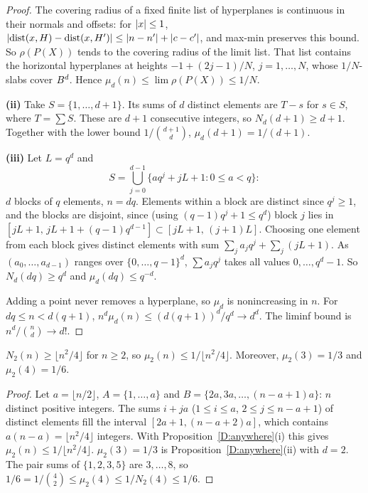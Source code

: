 \documentclass[11pt]{article}
\begin{document}
\begin{proof}
The covering radius of a fixed finite list of hyperplanes is continuous in their normals and
offsets: for $\left|x\right|\le1$, $\left|\operatorname{dist}(x,H)-\operatorname{dist}(x,H')\right|\le\left|n-n'\right|+\left|c-c'\right|$, and max-min
preserves this bound. So $\rho(P(X))$ tends to the covering radius of the limit list. That list
contains the horizontal hyperplanes at heights $-1+(2j-1)/N$, $j=1,\dots,N$, whose $1/N$-slabs cover
$B^d$. Hence $\mu_d(n)\le\lim\rho(P(X))\le1/N$.

\textbf{(ii)} Take $S=\{1,\dots,d+1\}$. Its sums of $d$ distinct elements are $T-s$ for $s\in S$, where
$T=\sum S$. These are $d+1$ consecutive integers, so $N_d(d+1)\ge d+1$. Together with the lower
bound $1/\binom{d+1}{d}$, $\mu_d(d+1)=1/(d+1)$.

\textbf{(iii)} Let $L=q^d$ and
\[
  S=\bigcup_{j=0}^{d-1}\{aq^j+jL+1:0\le a<q\}:
\]
$d$ blocks of $q$ elements, $n=dq$. Elements within a block are distinct since $q^j\ge1$, and the
blocks are disjoint, since (using $(q-1)q^j+1\le q^d$) block $j$ lies in
$[jL+1,\,jL+1+(q-1)q^{d-1}]\subset[jL+1,\,(j+1)L]$. Choosing one element from each block gives
distinct elements with sum $\sum_ja_jq^j+\sum_j(jL+1)$. As $(a_0,\dots,a_{d-1})$ ranges over
$\{0,\dots,q-1\}^d$, $\sum a_jq^j$ takes all values $0,\dots,q^d-1$. So $N_d(dq)\ge q^d$ and
$\mu_d(dq)\le q^{-d}$.

Adding a point never removes a hyperplane, so $\mu_d$ is nonincreasing in $n$. For
$dq\le n<d(q+1)$, $n^d\mu_d(n)\le(d(q+1))^d/q^d\to d^d$. The liminf bound is
$n^d/\binom{n}{d}\to d!$.
\end{proof}

\begin{lemma}\label{D:N2}
$N_2(n)\ge\lfloor n^2/4\rfloor$ for $n\ge2$, so $\mu_2(n)\le1/\lfloor n^2/4\rfloor$. Moreover, $\mu_2(3)=1/3$
and $\mu_2(4)=1/6$.
\end{lemma}

\begin{proof}
Let $a=\lfloor n/2\rfloor$, $A=\{1,\dots,a\}$ and $B=\{2a,3a,\dots,(n-a+1)a\}$: $n$ distinct positive
integers. The sums $i+ja$ ($1\le i\le a$, $2\le j\le n-a+1$) of distinct elements fill the interval
$[2a+1,(n-a+2)a]$, which contains $a(n-a)=\lfloor n^2/4\rfloor$ integers. With
Proposition~\ref{D:anywhere}(i) this gives $\mu_2(n)\le1/\lfloor n^2/4\rfloor$. $\mu_2(3)=1/3$ is
Proposition~\ref{D:anywhere}(ii) with $d=2$. The pair sums of
$\{1,2,3,5\}$ are $3,\dots,8$, so $1/6=1/\binom42\le\mu_2(4)\le1/N_2(4)\le1/6$.
\end{proof}
\end{document}
